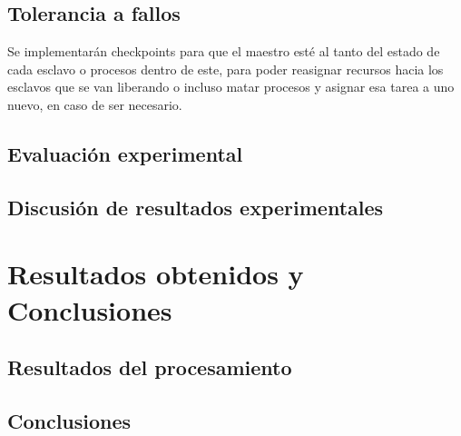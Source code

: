 \documentclass[journal]{IEEEtran}
\begin{document}
\subsection{Tolerancia a fallos}
Se implementarán checkpoints para que el maestro esté al tanto del estado de cada esclavo o procesos dentro de este, para poder reasignar recursos hacia los esclavos que se van liberando o incluso matar procesos y asignar esa tarea a uno nuevo, en caso de ser necesario.
\subsection{Evaluación experimental}
\subsection{Discusión de resultados experimentales}
\section{Resultados obtenidos y Conclusiones}
\subsection{Resultados del procesamiento}
\subsection{Conclusiones}


%
\end{document}
